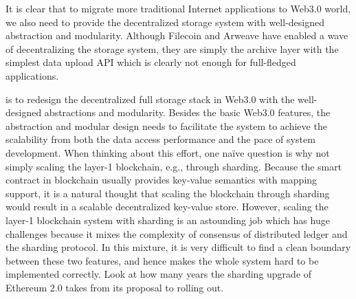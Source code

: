 It is clear that to migrate more traditional Internet applications to Web3.0 world, we also need to provide the decentralized storage system with well-designed abstraction and modularity. Although Filecoin and Arweave have enabled a wave of decentralizing the storage system, they are simply the archive layer with the simplest data upload API which is clearly not enough for full-fledged applications.

\project is to redesign the decentralized full storage stack in Web3.0 with the well-designed abstractions and modularity. Besides the basic Web3.0 features, the abstraction and modular design needs to facilitate the system to achieve the scalability from both the data access performance and the pace of system development. When thinking about this effort, one naïve question is why not simply scaling the layer-1 blockchain, e.g., through sharding. Because the smart contract in blockchain usually provides key-value semantics with mapping support, it is a natural thought that scaling the blockchain through sharding would result in a scalable decentralized key-value store. However, scaling the layer-1 blockchain system with sharding is an astounding job which has huge challenges because it mixes the complexity of consensus of distributed ledger and the sharding protocol. In this mixture, it is very difficult to find a clean boundary between these two features, and hence makes the whole system hard to be implemented correctly. Look at how many years the sharding upgrade of Ethereum 2.0 takes from its proposal to rolling out. 

